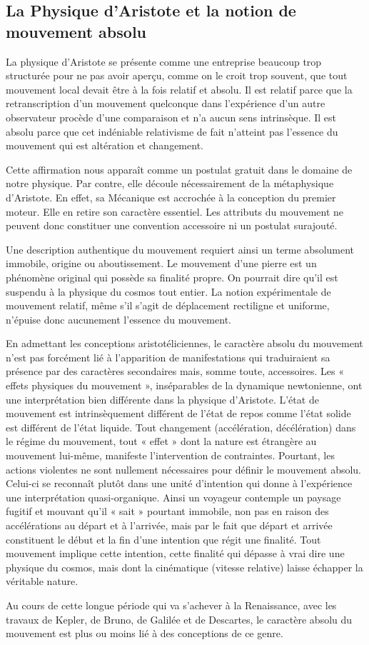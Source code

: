 \subsection{La Physique d’Aristote et la notion de mouvement absolu}

La physique d’Aristote se présente comme une entreprise beaucoup
trop structurée pour ne pas avoir aperçu, comme on le croit trop souvent,
que tout mouvement local devait être à la fois relatif et absolu. Il est
relatif parce que la retranscription d’un mouvement quelconque dans
l’expérience d’un autre observateur procède d’une comparaison et n’a
aucun sens intrinsèque. Il est absolu parce que cet indéniable relativisme
de fait n’atteint pas l’essence du mouvement qui est altération et changement.

Cette affirmation nous apparaît comme un postulat gratuit dans le
domaine de notre physique. Par contre, elle découle nécessairement de
la métaphysique d’Aristote. En effet, sa Mécanique est accrochée à la
conception du premier moteur. Elle en retire son caractère essentiel. Les
attributs du mouvement ne peuvent donc constituer une convention
accessoire ni un postulat surajouté.

Une description authentique du mouvement requiert ainsi un terme
absolument immobile, origine ou aboutissement. Le mouvement d’une
pierre est un phénomène original qui possède sa finalité propre. On
pourrait dire qu’il est suspendu à la physique du cosmos tout entier.
La notion expérimentale de mouvement relatif, même s’il s’agit de déplacement
rectiligne et uniforme, n’épuise donc aucunement l’essence du
mouvement.

En admettant les conceptions aristotéliciennes, le caractère absolu du
mouvement n’est pas forcément lié à l’apparition de manifestations qui
traduiraient sa présence par des caractères secondaires mais, somme
toute, accessoires. Les « effets physiques du mouvement », inséparables
de la dynamique newtonienne, ont une interprétation bien différente
dans la physique d’Aristote. L’état de mouvement est intrinsèquement
différent de l’état de repos comme l’état solide est différent de l’état
liquide. Tout changement (accélération, décélération) dans le régime du
mouvement, tout « effet » dont la nature est étrangère au mouvement
lui-même, manifeste l’intervention de contraintes. Pourtant, les actions
violentes ne sont nullement nécessaires pour définir le mouvement
absolu. Celui-ci se reconnaît plutôt dans une unité d'intention qui donne
à l’expérience une interprétation quasi-organique. Ainsi un voyageur
contemple un paysage fugitif et mouvant qu’il « sait » pourtant immobile,
non pas en raison des accélérations au départ et à l’arrivée, mais par le
fait que départ et arrivée constituent le début et la fin d’une intention
que régit une finalité. Tout mouvement implique cette intention, cette
finalité qui dépasse à vrai dire une physique du cosmos, mais dont la
cinématique (vitesse relative) laisse échapper la véritable nature.

Au cours de cette longue période qui va s’achever à la Renaissance,
avec les travaux de Kepler, de Bruno, de Galilée et de Descartes, le caractère
absolu du mouvement est plus ou moins lié à des conceptions de ce
genre.

